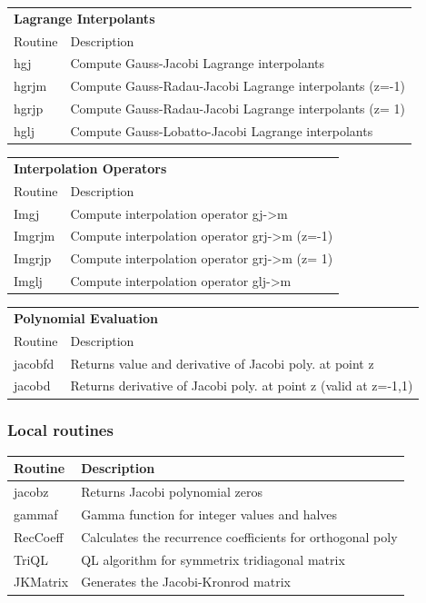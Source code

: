 \begin{tabular}{ll}
\toprule
\multicolumn{2}{l}{\textbf{Lagrange Interpolants}} \\
Routine & Description \\
\midrule
hgj & Compute Gauss-Jacobi Lagrange interpolants \\
hgrjm & Compute Gauss-Radau-Jacobi Lagrange interpolants (z=-1) \\
hgrjp & Compute Gauss-Radau-Jacobi Lagrange interpolants (z= 1) \\
hglj & Compute Gauss-Lobatto-Jacobi Lagrange interpolants \\
\bottomrule
\end{tabular}

\begin{tabular}{ll}
\toprule
\multicolumn{2}{l}{\textbf{Interpolation Operators}} \\
Routine & Description \\
\midrule
Imgj & Compute interpolation operator gj->m \\
Imgrjm & Compute interpolation operator grj->m (z=-1) \\
Imgrjp & Compute interpolation operator grj->m (z= 1) \\
Imglj & Compute interpolation operator glj->m \\
\bottomrule
\end{tabular}

\begin{tabular}{ll}
\toprule
\multicolumn{2}{l}{\textbf{Polynomial Evaluation}} \\
Routine & Description \\
\midrule
jacobfd & Returns value and derivative of Jacobi poly. at point z \\
jacobd & Returns derivative of Jacobi poly. at point z (valid at z=-1,1) \\
\bottomrule
\end{tabular}

\subsubsection{Local routines}
\begin{tabular}{ll}
\toprule
Routine & Description \\
\midrule
jacobz & Returns Jacobi polynomial zeros \\
gammaf & Gamma function for integer values and halves \\
RecCoeff & Calculates the recurrence coefficients for orthogonal poly \\
TriQL & QL algorithm for symmetrix tridiagonal matrix \\
JKMatrix & Generates the Jacobi-Kronrod matrix \\
\bottomrule
\end{tabular}

